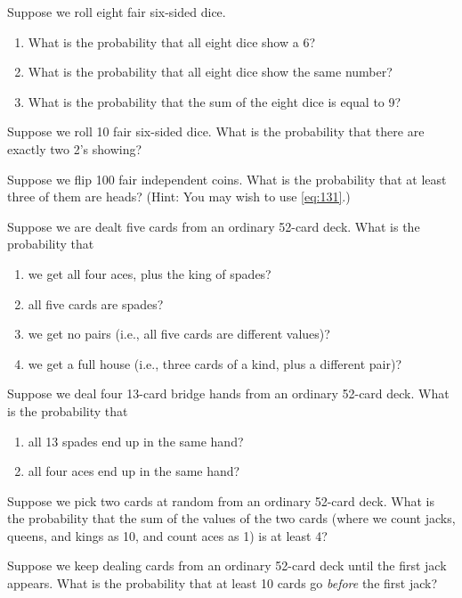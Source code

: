 \begin{exercises}
    \item Suppose we roll eight fair six-sided dice.
        \begin{enumerate}
            \item What is the probability that all eight dice show a 6?
            \item What is the probability that all eight dice show the same number?
            \item What is the probability that the sum of the eight dice is equal to 9?
        \end{enumerate}
    \item Suppose we roll 10 fair six-sided dice. What is the probability that there are exactly two 2's showing?
    \item Suppose we flip 100 fair independent coins. What is the probability that at least three of them are heads? (Hint: You may wish to use \autoref{eq:131}.)
    \item Suppose we are dealt five cards from an ordinary 52-card deck. What is the probability that
        \begin{enumerate}
            \item we get all four aces, plus the king of spades?
            \item  all five cards are spades?
            \item we get no pairs (i.e., all five cards are different values)?
            \item we get a full house (i.e., three cards of a kind, plus a different  pair)?
        \end{enumerate}
    \item Suppose we deal four 13-card bridge hands from an ordinary 52-card deck. What is the probability that
        \begin{enumerate}
            \item all 13 spades end up in the same hand?
            \item all four aces end up in the same hand?
        \end{enumerate}
    \item Suppose we pick two cards at random from an ordinary 52-card deck. What is the probability that the sum of the values of the two cards (where we count jacks, queens, and kings as 10, and count aces as 1) is at least 4?
    \item Suppose we keep dealing cards from an ordinary 52-card deck until the first jack appears. What is the probability that at least 10 cards go \emph{before} the first jack?

\end{exercises}
